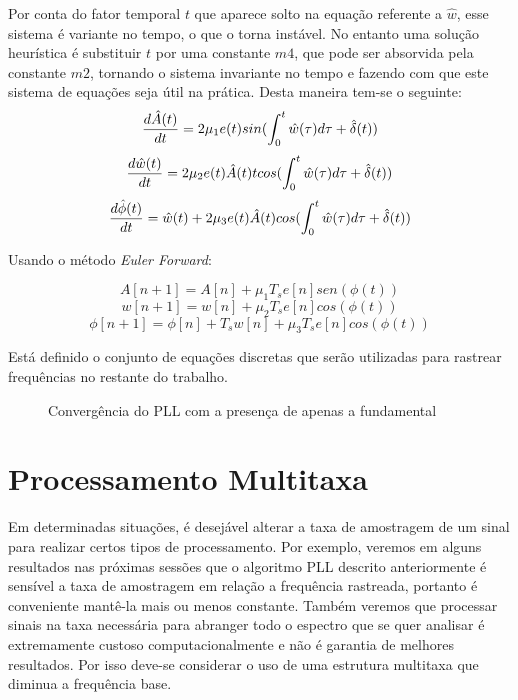 Por conta do fator temporal $t$ que aparece solto na equação referente a $\hat{w}$, esse sistema é variante no tempo, o que o torna instável. No entanto uma solução heurística é substituir $t$ por uma constante $m4$, que pode ser absorvida pela constante $m2$, tornando o sistema invariante no tempo e fazendo com que este sistema de equações seja útil na prática. Desta maneira tem-se o seguinte:
\begin{equation}
\frac{d\hat{A}(t)}{dt}=2\mu_1e(t)sin(\int_{0}^{t}\hat{w}(\tau)d\tau\space+\space\hat{\delta}(t))
\end{equation}
\begin{equation}
\frac{d\hat{w}(t)}{dt}=2\mu_2e(t)\hat{A}(t)tcos(\int_{0}^{t}\hat{w}(\tau)d\tau\space+\space\hat{\delta}(t))
\end{equation}
\begin{equation}
\frac{d\hat{\phi}(t)}{dt}=\hat{w}(t)+2\mu_3e(t)\hat{A}(t)cos(\int_{0}^{t}\hat{w}(\tau)d\tau\space+\space\hat{\delta}(t))
\end{equation}

Usando o método \textit{Euler Forward}:

\begin{equation}
A[n+1]=A[n]+\mu_1T_s e[n]sen(\phi(t))
\end{equation}
\begin{equation}
w[n+1]=w[n]+\mu_2T_s e[n]cos(\phi(t))
\end{equation}
\begin{equation}
\phi[n+1]=\phi[n] + T_s w[n] + \mu_3T_s e[n]cos(\phi(t))
\end{equation}

Está definido o conjunto de equações discretas que serão utilizadas para rastrear frequências no restante do trabalho.

\begin{figure}[h]
	\centering    
	\def\svgwidth{\columnwidth}
	
	\caption{Convergência do PLL com a presença de apenas a fundamental}
	\label{fig:your image label}
\end{figure}


\section{Processamento Multitaxa}

Em determinadas situações, é desejável alterar a taxa de amostragem de um sinal para realizar certos tipos de processamento. Por exemplo, veremos em alguns resultados nas próximas sessões que o algoritmo PLL descrito anteriormente é sensível a taxa de amostragem em relação a frequência rastreada, portanto é conveniente mantê-la mais ou menos constante. Também veremos que processar sinais na taxa necessária para abranger todo o espectro que se quer analisar é extremamente custoso computacionalmente e não é garantia de melhores resultados. Por isso deve-se considerar o uso de uma estrutura multitaxa que diminua a frequência base.

